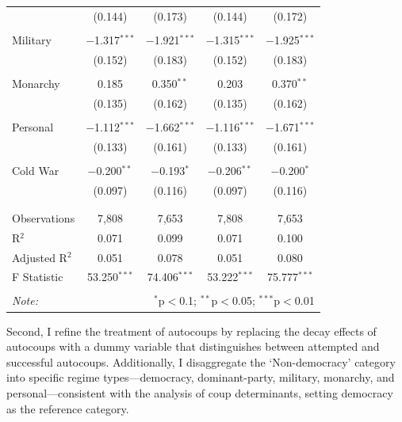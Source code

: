 \documentclass[
  12pt,
]{report}
\begin{document}
\begin{table}
{\begin{tabular}{@{\extracolsep{20pt}}lcccc}
  & (0.144) & (0.173) & (0.144) & (0.172) \\ 
  & & & & \\ 
 \hspace{1.5cm} Military & $-$1.317$^{***}$ & $-$1.921$^{***}$ & $-$1.315$^{***}$ & $-$1.925$^{***}$ \\ 
  & (0.152) & (0.183) & (0.152) & (0.183) \\ 
  & & & & \\ 
 \hspace{1.5cm} Monarchy & 0.185 & 0.350$^{**}$ & 0.203 & 0.370$^{**}$ \\ 
  & (0.135) & (0.162) & (0.135) & (0.162) \\ 
  & & & & \\ 
 \hspace{1.5cm} Personal & $-$1.112$^{***}$ & $-$1.662$^{***}$ & $-$1.116$^{***}$ & $-$1.671$^{***}$ \\ 
  & (0.133) & (0.161) & (0.133) & (0.161) \\ 
  & & & & \\ 
 Cold War & $-$0.200$^{**}$ & $-$0.193$^{*}$ & $-$0.206$^{**}$ & $-$0.200$^{*}$ \\ 
  & (0.097) & (0.116) & (0.097) & (0.116) \\ 
  & & & & \\ 
\hline \\[-1.8ex] 
Observations & 7,808 & 7,653 & 7,808 & 7,653 \\ 
R$^{2}$ & 0.071 & 0.099 & 0.071 & 0.100 \\ 
Adjusted R$^{2}$ & 0.051 & 0.078 & 0.051 & 0.080 \\ 
F Statistic & 53.250$^{***}$ & 74.406$^{***}$ & 53.222$^{***}$ & 75.777$^{***}$ \\ 
\hline 
\hline \\[-1.8ex] 
\textit{Note:}  & \multicolumn{4}{r}{$^{*}$p$<$0.1; $^{**}$p$<$0.05; $^{***}$p$<$0.01} \\ 
\end{tabular}

}

\end{table}%

Second, I refine the treatment of autocoups by replacing the decay
effects of autocoups with a dummy variable that distinguishes between
attempted and successful autocoups. Additionally, I disaggregate the
`Non-democracy' category into specific regime types---democracy,
dominant-party, military, monarchy, and personal---consistent with the
analysis of coup determinants, setting democracy as the reference
category.
\end{document}
